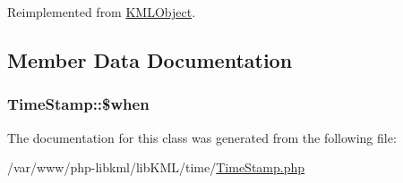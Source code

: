 Reimplemented from \hyperlink{classKMLObject_ae3c03ef6e733a6e8e59fb28672d4e334}{KMLObject}.



\subsection{Member Data Documentation}
\hypertarget{classTimeStamp_ad98f1816435c23e70c8e24e03bce7f30}{
\subsubsection[{\$when}]{\setlength{\rightskip}{0pt plus 5cm}TimeStamp::\$when}}
\label{d0/d19/classTimeStamp_ad98f1816435c23e70c8e24e03bce7f30}


The documentation for this class was generated from the following file:\begin{DoxyCompactItemize}
\item 
/var/www/php-\/libkml/libKML/time/\hyperlink{TimeStamp_8php}{TimeStamp.php}\end{DoxyCompactItemize}
